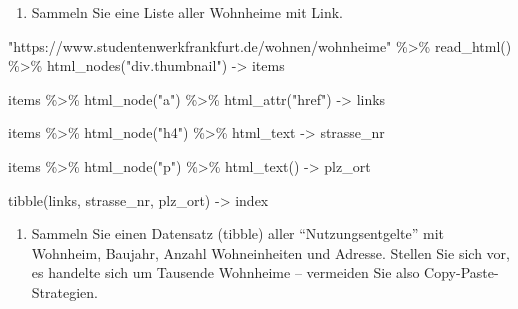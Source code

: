 \documentclass[
  ngerman,
]{article}
\newenvironment{Shaded}{\begin{snugshade}}{\end{snugshade}}
\newcommand{\FunctionTok}[1]{\textcolor[rgb]{0.00,0.00,0.00}{#1}}
\newcommand{\NormalTok}[1]{#1}
\newcommand{\OtherTok}[1]{\textcolor[rgb]{0.56,0.35,0.01}{#1}}
\newcommand{\SpecialCharTok}[1]{\textcolor[rgb]{0.00,0.00,0.00}{#1}}
\newcommand{\StringTok}[1]{\textcolor[rgb]{0.31,0.60,0.02}{#1}}
\providecommand{\tightlist}{%
  \setlength{\itemsep}{0pt}\setlength{\parskip}{0pt}}
\begin{document}
\begin{enumerate}
\def\labelenumi{\arabic{enumi}.}
\setcounter{enumi}{4}
\tightlist
\item
  Sammeln Sie eine Liste aller Wohnheime mit Link.
\end{enumerate}

\begin{Shaded}
\begin{Highlighting}[]
\StringTok{"https://www.studentenwerkfrankfurt.de/wohnen/wohnheime"} \SpecialCharTok{\%\textgreater{}\%}
  \FunctionTok{read\_html}\NormalTok{() }\SpecialCharTok{\%\textgreater{}\%}
  \FunctionTok{html\_nodes}\NormalTok{(}\StringTok{"div.thumbnail"}\NormalTok{) }\OtherTok{{-}\textgreater{}}\NormalTok{ items}

\NormalTok{items }\SpecialCharTok{\%\textgreater{}\%}
  \FunctionTok{html\_node}\NormalTok{(}\StringTok{"a"}\NormalTok{) }\SpecialCharTok{\%\textgreater{}\%}
  \FunctionTok{html\_attr}\NormalTok{(}\StringTok{"href"}\NormalTok{) }\OtherTok{{-}\textgreater{}}\NormalTok{ links}

\NormalTok{items }\SpecialCharTok{\%\textgreater{}\%}
  \FunctionTok{html\_node}\NormalTok{(}\StringTok{"h4"}\NormalTok{) }\SpecialCharTok{\%\textgreater{}\%}
\NormalTok{  html\_text }\OtherTok{{-}\textgreater{}}\NormalTok{ strasse\_nr}

\NormalTok{items }\SpecialCharTok{\%\textgreater{}\%}
  \FunctionTok{html\_node}\NormalTok{(}\StringTok{"p"}\NormalTok{) }\SpecialCharTok{\%\textgreater{}\%}
  \FunctionTok{html\_text}\NormalTok{() }\OtherTok{{-}\textgreater{}}\NormalTok{ plz\_ort}

\FunctionTok{tibble}\NormalTok{(links, strasse\_nr, plz\_ort) }\OtherTok{{-}\textgreater{}}\NormalTok{ index}
\end{Highlighting}
\end{Shaded}

\begin{enumerate}
\def\labelenumi{\arabic{enumi}.}
\setcounter{enumi}{5}
\tightlist
\item
  Sammeln Sie einen Datensatz (tibble) aller ``Nutzungsentgelte'' mit Wohnheim, Baujahr, Anzahl Wohneinheiten und Adresse. Stellen Sie sich vor, es handelte sich um Tausende Wohnheime -- vermeiden Sie also Copy-Paste-Strategien.
\end{enumerate}
\end{document}
